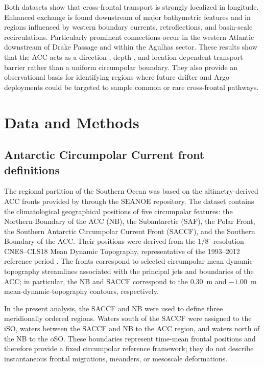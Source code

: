 \documentclass[
  draft
]{agujournal2025}
\begin{document}
        Both datasets show that cross-frontal transport is strongly localized in longitude. Enhanced exchange is found downstream of major bathymetric features and in regions influenced by western boundary currents, retroflections, and basin-scale recirculations. Particularly prominent connections occur in the western Atlantic downstream of Drake Passage and within the Agulhas sector. These results show that the ACC acts as a direction-, depth-, and location-dependent transport barrier rather than a uniform circumpolar boundary. They also provide an observational basis for identifying regions where future drifter and Argo deployments could be targeted to sample common or rare cross-frontal pathways.

\section{Data and Methods}
    \label{sec:data_methods}
    \subsection{Antarctic Circumpolar Current front definitions}
        The regional partition of the Southern Ocean was based on the altimetry-derived ACC fronts provided by \cite{data:park2019} through the SEANOE repository. The dataset contains the climatological geographical positions of five circumpolar features: the Northern Boundary of the ACC (NB), the Subantarctic  (SAF), the Polar Front, the Southern Antarctic Circumpolar Current Front (SACCF), and the Southern Boundary of the ACC. Their positions were derived from the $1/8^{\circ}$-resolution CNES--CLS18 Mean Dynamic Topography, representative of the 1993--2012 reference period \cite{art:park2019}. The fronts correspond to selected circumpolar mean-dynamic-topography streamlines associated with the principal jets and boundaries of the ACC; in particular, the NB and SACCF correspond to the $0.30$~m and $-1.00$~m mean-dynamic-topography contours, respectively.
        
        In the present analysis, the SACCF and NB were used to define three meridionally ordered regions. Waters south of the SACCF were assigned to the iSO, waters between the SACCF and NB to the ACC region, and waters north of the NB to the oSO. These boundaries represent time-mean frontal positions and therefore provide a fixed circumpolar reference framework; they do not describe instantaneous frontal migrations, meanders, or mesoscale deformations.
\end{document}
